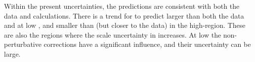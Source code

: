 Within the present uncertainties, the \Powheg predictions are consistent with both
the data and \NLOjetpp calculations. There is a trend for \Powheg to predict larger
 than both the data and \NLOjetpp at low \pT, and smaller  than \NLOjetpp (but
closer to the data) in the high-\pT region. These are also the regions where the
scale uncertainty in \NLOjetpp increases. At low \pT the non-perturbative corrections
have a significant influence, and their uncertainty can be large.

\begin{figure}[htpb]
  \quad
\end{figure}
